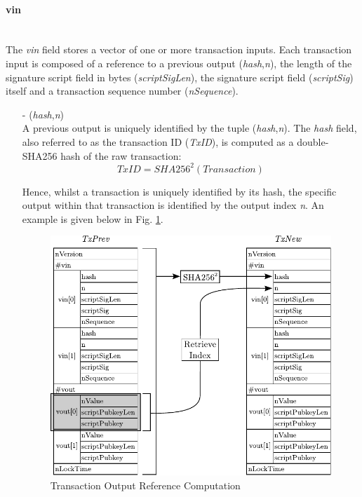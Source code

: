 \paragraph{vin}~\\
The \textit{vin} field stores a vector of one or more transaction inputs. Each transaction input is composed of a reference to a previous output (\textit{hash},\textit{n}), the length of the signature script field in bytes (\textit{scriptSigLen}),
the signature script field (\textit{scriptSig}) itself and a transaction sequence number (\textit{nSequence}).

\begin{itemize}
\item[-] (\textit{hash},\textit{n})~\\
A previous output is uniquely identified by the tuple (\textit{hash},\textit{n}). The \textit{hash} field, also referred to as the transaction ID (\textit{TxID}), is computed as a double-SHA256 hash of the raw transaction:
\begin{equation}
TxID = SHA256^{2}(Transaction)
\end{equation}

Hence, whilst a transaction is uniquely identified by its hash, the specific output within that transaction is identified by the output index \textit{n}. An example is given below in Fig. \ref{fig:PrevOut}.
\begin{figure}[ht!]
 \centering
 \includegraphics[scale=1]{Images/Transaction2In2Out.pdf}
 \caption{Transaction Output Reference Computation} \label{fig:PrevOut}
\end{figure}


\end{itemize}
